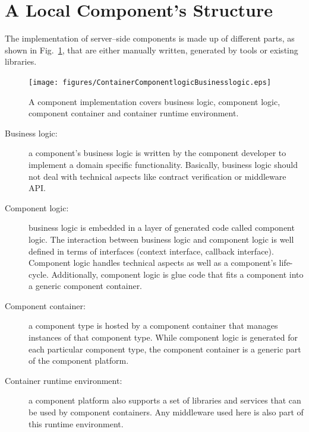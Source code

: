 \section{A Local Component's Structure}
\label{ComponentStructure}

The implementation of server--side components is made up of different parts,
as shown in Fig.~\ref{ContainerComponentlogicBusinesslogic}, that are either
manually written, generated by tools or existing libraries.

\begin{figure}[htbp]
    \begin{center}
    \texttt{[image: figures/ContainerComponentlogicBusinesslogic.eps]}
    \caption{A component implementation covers business logic, component
    logic, component container and container runtime environment.}
    \label{ContainerComponentlogicBusinesslogic}            
    \end{center}
\end{figure}

\begin{description}
\item [Business logic:]
  a component's business logic is written by the component developer to 
  implement   a domain specific functionality.
  Basically, business logic should not deal with technical aspects like contract
  verification or middleware API.
  
\item [Component logic:]
  business logic is embedded in a layer of generated code called component 
  logic. The interaction between business logic and component logic is well 
  defined in terms of interfaces (context interface, callback interface).
  Component logic handles technical aspects as well as a component's life-cycle.
  Additionally, component logic is glue code that fits a component into a 
  generic component container.
  
\item [Component container:]
  a component type is hosted by a component container that manages instances of
  that component type.
  While component logic is generated for each particular component type, the 
  component container is a generic part of the component platform.
  
\item [Container runtime environment:]
  a component platform also supports a set of libraries and services that can 
  be used by component containers.
  Any middleware used here is also part of this runtime environment.
\end{description}


